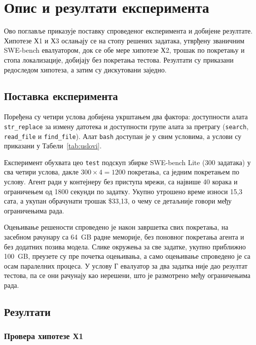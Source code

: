 \documentclass[12pt,a4paper]{report}
\begin{document}
	\chapter{Опис и резултати експеримента}
	
	Ово поглавље приказује поставку спроведеног експеримента и добијене
	резултате. Хипотезе Х1 и Х3 ослањају се на стопу решених задатака,
	утврђену званичним SWE-bench евалуатором, док се обе мере хипотезе Х2,
	трошак по покретању и стопа локализације, добијају без покретања тестова.
	Резултати су приказани редоследом хипотеза, а затим су дискутовани
	заједно.
	
	\section{Поставка експеримента}
	
	Поређена су четири услова добијена укрштањем два фактора: доступности алата
	\texttt{str\_replace} за измену датотека и доступности групе алата за
	претрагу (\texttt{search}, \texttt{read\_file} и \texttt{find\_file}). Алат
	\texttt{bash} доступан је у свим условима, а услови су приказани у
	Табели~\ref{tab:uslovi}.
	
	Експеримент обухвата цео \texttt{test} подскуп збирке SWE-bench Lite
	(300 задатака) у сва четири услова, дакле $300 \times 4 = 1200$ покретања,
	са једним покретањем по услову. Агент ради у контејнеру без приступа мрежи,
	са највише 40 корака и ограничењем од 1800 секунди по задатку. Укупно
	утрошено време износи 15,3 сата, а укупан обрачунати трошак \$33,13, о чему
	се детаљније говори међу ограничењима рада.
	
	Оцењивање решености спроведено је након завршетка свих покретања, на
	засебном рачунару са 64~GB радне меморије, без поновног покретања агента и
	без додатних позива модела. Слике окружења за све задатке, укупно
	приближно 100~GB, преузете су пре почетка оцењивања, а само оцењивање
	спроведено је са осам паралелних процеса. У услову Г евалуатор за два
	задатка није дао резултат тестова, па се они рачунају као нерешени, што је
	размотрено међу ограничењима рада.
	
	\section{Резултати}
	
	\subsection{Провера хипотезе Х1}
	
\end{document}
